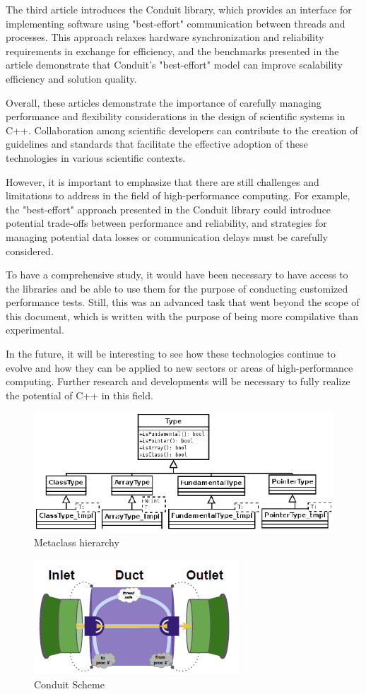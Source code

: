 \documentclass[11pt]{article}
\begin{document}
\begin{multicols*}{2}[\columnsep=1cm]
The third article introduces the Conduit library, which provides an interface for implementing software using "best-effort" communication between threads and processes. This approach relaxes hardware synchronization and reliability requirements in exchange for efficiency, and the benchmarks presented in the article demonstrate that Conduit's "best-effort" model can improve scalability efficiency and solution quality.

Overall, these articles demonstrate the importance of carefully managing performance and flexibility considerations in the design of scientific systems in C++. Collaboration among scientific developers can contribute to the creation of guidelines and standards that facilitate the effective adoption of these technologies in various scientific contexts.

However, it is important to emphasize that there are still challenges and limitations to address in the field of high-performance computing. For example, the "best-effort" approach presented in the Conduit library could introduce potential trade-offs between performance and reliability, and strategies for managing potential data losses or communication delays must be carefully considered.

To have a comprehensive study, it would have been necessary to have access to the libraries and be able to use them for the purpose of conducting customized performance tests. Still, this was an advanced task that went beyond the scope of this document, which is written with the purpose of being more compilative than experimental.

In the future, it will be interesting to see how these technologies continue to evolve and how they can be applied to new sectors or areas of high-performance computing. Further research and developments will be necessary to fully realize the potential of C++ in this field.
\end{multicols*}

\begin{figure}
    \centering
    \includegraphics[width=0.5\linewidth]{ClassType.png}
    \caption{Metaclass hierarchy}
    \label{fig:ClassType}
\end{figure}

\begin{figure}
    \centering
    \includegraphics[width=0.5\linewidth]{Conduit.png}
    \caption{Conduit Scheme}
    \label{fig:Conduit}
\end{figure}
\clearpage
\printbibliography
\end{document}
